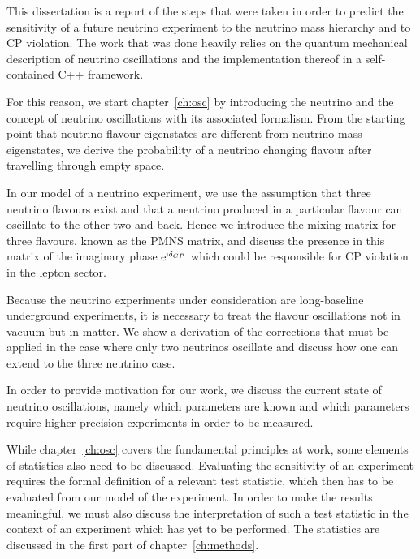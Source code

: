 \label{ch:introduction}
This dissertation is a report of the steps that were taken in order to predict the
sensitivity of a future neutrino experiment to the neutrino mass hierarchy and
to CP violation.
The work that was done heavily relies on the quantum mechanical description of
neutrino oscillations and the implementation thereof in a self-contained C++
framework.

For this reason, we start chapter~\ref{ch:osc} by introducing the neutrino and the
concept of neutrino oscillations with its associated formalism. From the
starting point that neutrino flavour eigenstates are different from neutrino
mass eigenstates, we derive the probability of a neutrino changing flavour
after travelling through empty space. 

In our model of a neutrino experiment, we use the assumption that three
neutrino flavours exist and that a neutrino produced in a particular flavour
can oscillate to the other two and back. Hence we introduce the mixing matrix
for three flavours, known as the PMNS matrix, and discuss the presence in this
matrix of the imaginary phase $\mathrm{e}^{\mathrm{i}\delta_{CP}}$ which could be responsible for CP
violation in the lepton sector.

Because the neutrino experiments under consideration are long-baseline
underground experiments, it is necessary to treat the flavour oscillations not
in vacuum but in matter. We show a derivation of the corrections that must be
applied in the case where only two neutrinos oscillate and discuss how one can
extend to the three neutrino case.

In order to provide motivation for our work, we discuss the current state of
neutrino oscillations, namely which parameters are known and which parameters
require higher precision experiments in order to be measured.


While chapter~\ref{ch:osc} covers the fundamental principles at work, some elements of
statistics also need to be discussed. Evaluating the sensitivity of an
experiment requires the formal definition of a relevant test statistic, which
then has to be evaluated from our model of the experiment. In order to make the
results meaningful, we must also discuss the interpretation of such a test
statistic in the context of an experiment which has yet to be performed.
The statistics are discussed in the first part of chapter~\ref{ch:methods}.

